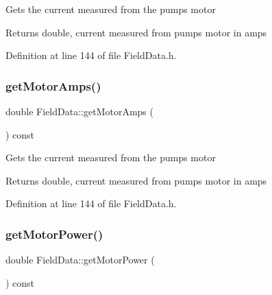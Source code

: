 Gets the current measured from the pump\textquotesingle{}s motor

\begin{DoxyReturn}{Returns}
double, current measured from pump\textquotesingle{}s motor in amps 
\end{DoxyReturn}


Definition at line 144 of file Field\+Data.\+h.

\mbox{\label{class_field_data_ad2b4fffb00fa7cfa6f69487e1034989a}} 
\subsubsection{\texorpdfstring{get\+Motor\+Amps()}{getMotorAmps()}\hspace{0.1cm}{\footnotesize\ttfamily [3/3]}}
{\footnotesize\ttfamily double Field\+Data\+::get\+Motor\+Amps (\begin{DoxyParamCaption}{ }\end{DoxyParamCaption}) const\hspace{0.3cm}{\ttfamily [inline]}}

Gets the current measured from the pump\textquotesingle{}s motor

\begin{DoxyReturn}{Returns}
double, current measured from pump\textquotesingle{}s motor in amps 
\end{DoxyReturn}


Definition at line 144 of file Field\+Data.\+h.

\mbox{\label{class_field_data_a3e8e1bf84bbd00b9b52b803147968c81}} 
\subsubsection{\texorpdfstring{get\+Motor\+Power()}{getMotorPower()}\hspace{0.1cm}{\footnotesize\ttfamily [1/3]}}
{\footnotesize\ttfamily double Field\+Data\+::get\+Motor\+Power (\begin{DoxyParamCaption}{ }\end{DoxyParamCaption}) const\hspace{0.3cm}{\ttfamily [inline]}}

